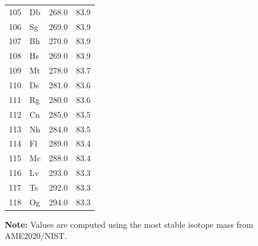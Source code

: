 \documentclass[11pt,a4paper]{article}
\begin{document}
\begin{longtable}{c l c c}
		105& Db  & 268.0  & 83.9 \\
		106& Sg  & 269.0  & 83.9 \\
		107& Bh  & 270.0  & 83.9 \\
		108& Hs  & 269.0  & 83.9 \\
		109& Mt  & 278.0  & 83.7 \\
		110& Ds  & 281.0  & 83.6 \\
		111& Rg  & 280.0  & 83.6 \\
		112& Cn  & 285.0  & 83.5 \\
		113& Nh  & 284.0  & 83.5 \\
		114& Fl  & 289.0  & 83.4 \\
		115& Mc  & 288.0  & 83.4 \\
		116& Lv  & 293.0  & 83.3 \\
		117& Ts  & 292.0  & 83.3 \\
		118& Og  & 294.0  & 83.3 \\
		\bottomrule
	\end{longtable}
	\vspace{0.5cm}
	\noindent
	\textbf{Note:} Values are computed using the most stable isotope mass from AME2020/NIST.
	
\end{document}
